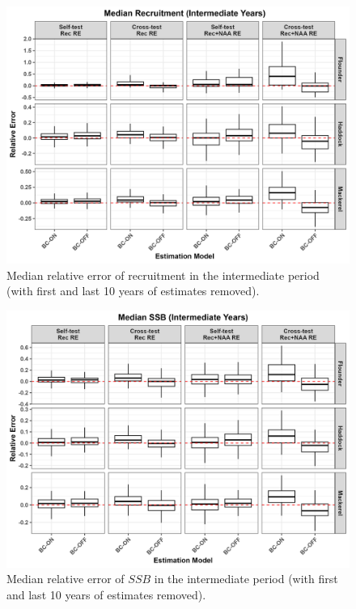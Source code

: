 \documentclass[
  12pt,
]{article}
\begin{document}
\begin{figure}[H]
\centering
\includegraphics[width=\textwidth]{Revised_Figures&Tables/Rec_intermediate.PNG}
\caption{Median relative error of recruitment in the intermediate period (with first and last 10 years of estimates removed).}
\label{fig:supp_Rec_intermediate}
\end{figure}

\begin{figure}[H]
\centering
\includegraphics[width=\textwidth]{Revised_Figures&Tables/SSB_intermediate.PNG}
\caption{Median relative error of $SSB$ in the intermediate period (with first and last 10 years of estimates removed).}
\label{fig:supp_SSB_intermediate}
\end{figure}

\renewcommand{\thefigure}{\arabic{figure}}
\end{document}
